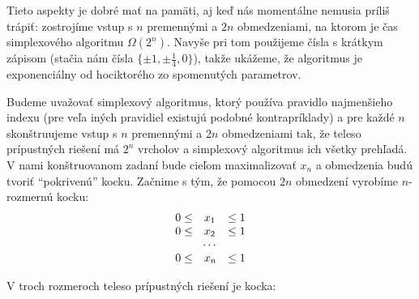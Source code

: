 \noindent
Tieto aspekty je dobré mať na pamäti, aj keď nás momentálne nemusia príliš trápiť: zostrojíme vstup s $n$
premennými a $2n$ obmedzeniami, na ktorom je čas simplexového algoritmu $\Omega(2^n)$. Navyše pri tom použijeme
čísla s krátkym zápisom (stačia nám čísla $\{\pm1,\pm\frac{1}{4},0\}$), takže ukážeme, že algoritmus
je exponenciálny od hociktorého zo spomenutých parametrov.

\noindent
Budeme uvažovať simplexový algoritmus, ktorý používa pravidlo najmenšieho indexu (pre veľa iných pravidiel
existujú podobné kontrapríklady) a pre každé $n$ skonštruujeme vstup s $n$ premennými a $2n$ obmedzeniami
tak, že teleso prípustných riešení má $2^n$ vrcholov a simplexový algoritmus ich všetky prehľadá. 
V nami konštruovanom zadaní bude cieľom maximalizovať $x_n$ a obmedzenia budú tvoriť ``pokrivenú'' kocku.
Začnime s tým, že pomocou $2n$ obmedzení vyrobíme  $n$-rozmernú kocku:
$$
\begin{array}{rll}
  0\le &x_1& \le 1\\
  0\le &x_2& \le 1\\
  \multicolumn{3}{c}{\cdots}\\
  0\le &x_n& \le 1
\end{array}
$$

\noindent
V troch rozmeroch teleso prípustných riešení je kocka:
\renewcommand{\common}{
    \draw[->,thin]
      (1,0,0) -- (1.2,0,0) node[anchor=north east]{$x$};
    \draw[->,thin]
      (0,1,0) -- (0,1.2,0) node[anchor=north west]{$y$};
    \draw[->,thin]
      (0,0,1) -- (0,0,1.2) node[anchor=south]{$z$};

}

\newcommand{\tmpNode}[2]{
  (#1) circle (.5pt) node[anchor=#2] {\footnotesize $(#1)$}
}

\begin{center}
\end{center}


